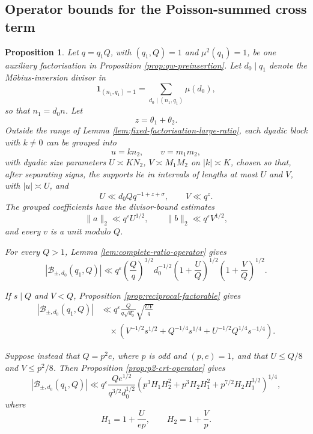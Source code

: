\documentclass[12pt, a4paper]{amsart}
\numberwithin{equation}{section}
\newcommand{\ep}{\varepsilon}
\renewcommand{\le}{\leqslant}
\theoremstyle{plain}
\newtheorem{prop}[lem]{Proposition}
\begin{document}
\subsection{Operator bounds for the Poisson-summed cross term}

\begin{prop}\label{prop:allq-qw-operator-insertion}
Let $q=q_1Q$, with $(q_1,Q)=1$ and $\mu^2(q_1)=1$, be one auxiliary factorisation in Proposition \ref{prop:qw-preinsertion}. Let $d_0\mid q_1$ denote the M\"obius-inversion divisor in
$$
\mathbf 1_{(n_1,q_1)=1}
=\sum_{d_0\mid(n_1,q_1)}\mu(d_0),
$$
so that $n_1=d_0n$. Let
$$
z=\theta_1+\theta_2.
$$
Outside the range of Lemma \ref{lem:fixed-factorisation-large-ratio}, each dyadic block with $k\ne0$ can be grouped into
$$
u=kn_2,\qquad v=m_1m_2,
$$
 with dyadic size parameters $U\asymp KN_2$, $V\asymp M_1M_2$ on $|k|\asymp K$, chosen so that, after separating signs, the supports lie in intervals of lengths at most $U$ and $V$, with $|u|\asymp U$, and
\begin{equation}\label{eq:allq-grouped-ranges}
U\ll d_0Qq^{-1+z+\sigma},
\qquad
V\ll q^{z}.
\end{equation}
The grouped coefficients have the divisor-bound estimates
$$
\|a\|_2\ll q^\ep U^{1/2},
\qquad
\|b\|_2\ll q^\ep V^{1/2},
$$
and every $v$ is a unit modulo $Q$.

For every $Q>1$, Lemma \ref{lem:complete-ratio-operator} gives
\begin{equation}\label{eq:allq-complete-operator-block}
|\mathcal B_{\pm,d_0}(q_1,Q)|
\ll q^\ep
\left(\frac Qq\right)^{3/2}d_0^{-1/2}
\left(1+\frac UQ\right)^{1/2}
\left(1+\frac VQ\right)^{1/2}.
\end{equation}

If $s\mid Q$ and $V<Q$, Proposition \ref{prop:reciprocal-factorable} gives
\begin{equation}\label{eq:allq-factorable-block}
\begin{aligned}
|\mathcal B_{\pm,d_0}(q_1,Q)|
&\ll q^\ep\frac{Q}{q\sqrt {d_0}}
\sqrt{\frac{UV}{q}}\\
&\quad\times
\left(
V^{-1/2}s^{1/2}
+Q^{-1/4}s^{1/4}
+U^{-1/2}Q^{1/4}s^{-1/4}\right).
\end{aligned}
\end{equation}

Suppose instead that $Q=p^2e$, where $p$ is odd and $(p,e)=1$, and that $U\le Q/8$ and $V\le p^2/8$. Then Proposition \ref{prop:p2-crt-operator} gives
\begin{equation}\label{eq:allq-p2-block}
|\mathcal B_{\pm,d_0}(q_1,Q)|
\ll q^\ep
\frac{Qe^{1/2}}{q^{3/2}d_0^{1/2}}
\left(
p^3H_1H_2^2+p^3H_2H_1^2
+p^{7/2}H_2H_1^{3/2}\right)^{1/4},
\end{equation}
where
$$
H_1=1+\frac{U}{ep},
\qquad
H_2=1+\frac{V}{p}.
$$
\end{prop}
\end{document}
